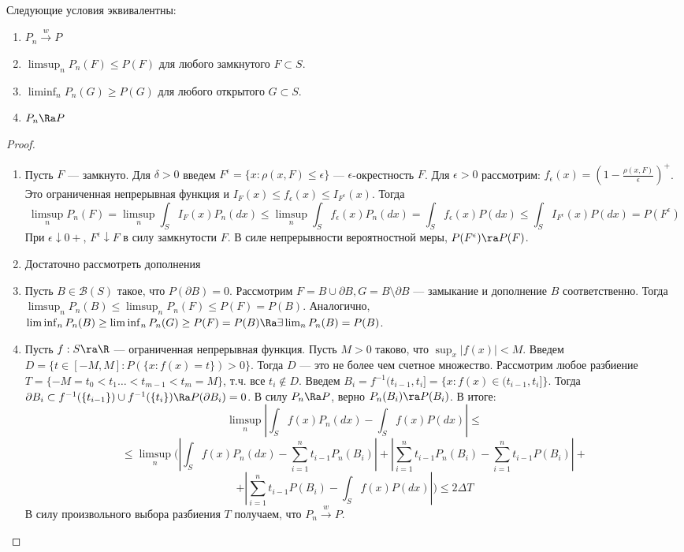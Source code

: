\begin{theorem}[Алексанрова]
    Следующие условия эквивалентны:
    \begin{enumerate}
        \item \(P_n \xrightarrow{w} P\)
        \item \(\limsup_{n} P_n(F) \le P(F)\) для любого замкнутого \(F \subset S\).
        \item \(\liminf_{n} P_n(G) \ge P(G)\) для любого открытого \(G \subset S\).
        \item \(P_n \Ra P\)
    \end{enumerate}
\end{theorem}
\begin{proof}
    \begin{enumerate}
        \item[\((1) \Ra (2)\)] Пусть \(F\) --- замкнуто. Для \(\delta > 0\) введем \(F^{\epsilon} = \{x: \rho(x, F) \le \epsilon\}\) --- \(\epsilon\)-окрестность \(F\). Для \(\epsilon > 0\) рассмотрим: \(f_\epsilon(x) = \left( 1 - \frac{\rho(x, F)}{\epsilon} \right)^+\). Это ограниченная непрерывная функция и \(I_F(x) \le f_\epsilon(x) \le I_{F^\epsilon}(x)\). Тогда
        \[\limsup_{n}P_n(F) = \limsup_{n}\int_SI_F(x)P_n(dx) \le \limsup_n \int_S f_\epsilon(x)P_n(dx) = \int_S f_\epsilon(x)P(dx) \le \int_S I_{F^\epsilon}(x)P(dx) = P(F^{\epsilon})\]
        При \(\epsilon \downarrow 0+\), \(F^\epsilon \downarrow F\) в силу замкнутости \(F\). В силе непрерывности вероятностной меры, \(P(F^{\epsilon}) \ra P(F)\).
        \item[\((2) \Lra (3)\)] Достаточно рассмотреть дополнения
        \item[\((2), (3) \Ra (4)\)] Пусть \(B \in \mathcal{B}(S)\) такое, что \(P(\partial B) = 0\). Рассмотрим \(F = B \cup \partial B, G = B \setminus \partial B\) --- замыкание и дополнение \(B\) соответственно. Тогда \(\limsup_n P_n(B) \le \limsup_n P_n(F) \le P(F) = P(B)\). Аналогично, \(\liminf_n P_n(B) \ge \liminf_n P_n(G) \ge P(F) = P(B) \Ra \exists \lim_n P_n(B) = P(B)\).
        \item[\((4) \Ra (1)\)] Пусть \(f: S \ra \R\) --- ограниченная непрерывная функция. Пусть \(M > 0\) таково, что \(\sup_{x}|f(x)| < M\). Введем \(D = \{t \in [-M, M]: P(\{x: f(x) = t\}) > 0\}\). Тогда \(D\) --- это не более чем счетное множество. Рассмотрим любое разбиение \(T = \{-M = t_0 < t_1 \dots < t_{m - 1} < t_m = M\}\), т.ч. все \(t_i \notin D\). Введем \(B_i = f^{-1}(t_{i - 1}, t_i] = \{x: f(x) \in (t_{i - 1}, t_i]\}\). Тогда \(\partial B_i \subset f^{-1}(\{t_{i - 1}\}) \cup f^{-1}(\{t_{i}\}) \Ra P(\partial B_i) = 0\). В силу \(P_n \Ra P\), верно \(P_n(B_i) \ra P(B_i)\). В итоге:
        \[\limsup_n \left| \int_S f(x)P_n(dx) - \int_S f(x)P(dx) \right| \le\]\[\le \limsup_n \Bigg( \left| \int_S f(x)P_n(dx) - \sum_{i = 1}^n t_{i - 1}P_n(B_i) \right| + \left| \sum_{i = 1}^n t_{i - 1}P_n(B_i) - \sum_{i = 1}^n t_{i - 1}P(B_i) \right| +\]
        \[+ \left| \sum_{i = 1}^n t_{i - 1}P(B_i) - \int_S f(x)P(dx) \right|\Bigg) \le 2\Delta T\]
        В силу произвольного выбора разбиения \(T\) получаем, что \(P_n \xrightarrow{w} P\).
    \end{enumerate}
\end{proof}

